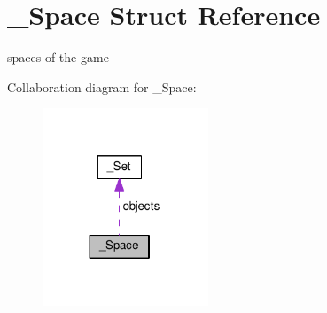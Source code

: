 \hypertarget{struct__Space}{}\section{\+\_\+\+Space Struct Reference}
\label{struct__Space}


spaces of the game  




Collaboration diagram for \+\_\+\+Space\+:
\nopagebreak
\begin{figure}[H]
\begin{center}
\leavevmode
\includegraphics[width=140pt]{struct__Space__coll__graph}
\end{center}
\end{figure}
